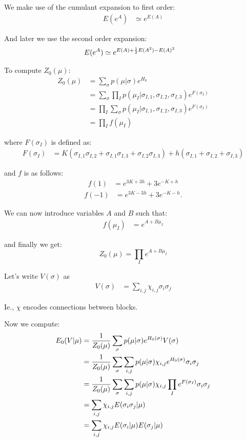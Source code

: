\documentclass[11pt]{article}
\begin{document}
We make use of the cumulant expansion to first order:
\begin{align*}
E(e^{A}) &\simeq e^{E(A)}
\end{align*}

And later we use the second order expansion:
\begin{align*}
E(e^{A}) &\simeq e^{E(A)+{{1} \over {2}}E(A^{2})-E(A)^{2}}
\end{align*}

To compute $Z_0(\mu)$:
\begin{align*}
Z_{0}(\mu) &= \sum_{\sigma} p(\mu | \sigma)e^{H_{0}}\\
 &= \sum_{\sigma} \prod_{I} p(\mu_{I} | \sigma_{I,1}, \sigma_{I,2}, \sigma_{I,3})e^{F(\sigma_{I})}\\
 &= \prod_{I} \sum_{\sigma} p(\mu_{I} | \sigma_{I,1}, \sigma_{I,2}, \sigma_{I,3})e^{F(\sigma_{I})}\\
 &= \prod_{I} f(\mu_{I})
\end{align*}

where $F(\sigma_I)$ is defined as:
\begin{align*}
F(\sigma_{I}) &= K(\sigma_{I,1}\sigma_{I,2}+\sigma_{I,1}\sigma_{I,3}+\sigma_{I,2}\sigma_{I,3})+h(\sigma_{I,1}+\sigma_{I,2}+\sigma_{I,3})
\end{align*}

and $f$ is as follows:
\begin{align*}
f(1) &= e^{3K+3h}+3e^{-K+h}
\end{align*}
\begin{align*}
f(-1) &= e^{3K-3h}+3e^{-K-h}.
\end{align*}

We can now introduce variables $A$ and $B$ such that:
\begin{align*}
f(\mu_{I}) &= e^{A+B\mu_{I}}
\end{align*}

and finally we get:
$$\boxed{Z_{0}(\mu) = \prod_{I} e^{A+B\mu_{I}}}$$


Let's write $V(\sigma)$ as
\begin{align*}
V(\sigma) &= \sum_{i,j} \chi_{i,j}\sigma_{i}\sigma_{j}
\end{align*}

Ie., $\chi$ encodes connections between blocks.

Now we compute:
\begin{align*}
E_{0}(V | \mu) &= {{1} \over {Z_{0}(\mu)}}\sum_{\sigma} p(\mu | \sigma)e^{H_{0}(\sigma)}V(\sigma)\\
 &= {{1} \over {Z_{0}(\mu)}}\sum_{\sigma} \sum_{i,j} p(\mu | \sigma)\chi_{i,j}e^{H_{0}(\sigma)}\sigma_{i}\sigma_{j}\\
 &= {{1} \over {Z_{0}(\mu)}}\sum_{\sigma} \sum_{i,j} p(\mu | \sigma)\chi_{i,j}\prod_{I} e^{F(\sigma_{I})}\sigma_{i}\sigma_{j}\\
 &= \sum_{i,j} \chi_{i,j}E(\sigma_{i}\sigma_{j} | \mu)\\
 &= \sum_{i,j} \chi_{i,j}E(\sigma_{i} | \mu)E(\sigma_{j} | \mu)
\end{align*}
\end{document}
